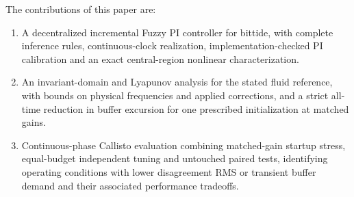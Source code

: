 The contributions of this paper are:
\begin{enumerate}
  \item A decentralized incremental Fuzzy PI controller for bittide,
  with complete inference rules, continuous-clock realization,
  implementation-checked PI calibration and an exact central-region
  nonlinear characterization.
  \item An invariant-domain and Lyapunov analysis for the stated fluid
  reference, with bounds on physical frequencies and applied corrections,
  and a strict all-time reduction in buffer excursion for one
  prescribed initialization at matched gains.
  \item Continuous-phase Callisto evaluation combining matched-gain
  startup stress, equal-budget independent tuning and untouched
  paired tests, identifying operating conditions with lower
  disagreement RMS or transient buffer demand and their associated
  performance tradeoffs.
\end{enumerate}



